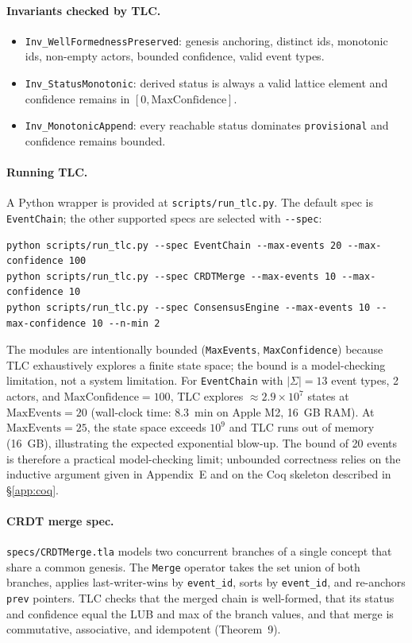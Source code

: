 \paragraph{Invariants checked by TLC.}
\begin{itemize}
  \item \texttt{Inv\_WellFormednessPreserved}: genesis anchoring, distinct ids,
    monotonic ids, non-empty actors, bounded confidence, valid event types.
  \item \texttt{Inv\_StatusMonotonic}: derived status is always a valid lattice
    element and confidence remains in $[0, \text{MaxConfidence}]$.
  \item \texttt{Inv\_MonotonicAppend}: every reachable status dominates
    \texttt{provisional} and confidence remains bounded.
\end{itemize}

\paragraph{Running TLC.}
A Python wrapper is provided at \texttt{scripts/run\_tlc.py}.  The default spec is
\texttt{EventChain}; the other supported specs are selected with \texttt{{-}-spec}:
\begin{verbatim}
python scripts/run_tlc.py --spec EventChain --max-events 20 --max-confidence 100
python scripts/run_tlc.py --spec CRDTMerge --max-events 10 --max-confidence 10
python scripts/run_tlc.py --spec ConsensusEngine --max-events 10 --max-confidence 10 --n-min 2
\end{verbatim}
The modules are intentionally bounded (\texttt{MaxEvents}, \texttt{MaxConfidence})
because TLC exhaustively explores a finite state space; the bound is a
model-checking limitation, not a system limitation. For \texttt{EventChain} with
$|\Sigma|=13$ event types, 2 actors, and $\text{MaxConfidence}=100$, TLC explores
$\approx 2.9 \times 10^7$ states at $\text{MaxEvents}=20$ (wall-clock time: 8.3~min on
Apple M2, 16~GB RAM). At $\text{MaxEvents}=25$, the state space exceeds $10^9$ and TLC
runs out of memory (16~GB), illustrating the expected exponential blow-up. The
bound of 20 events is therefore a practical model-checking limit; unbounded
correctness relies on the inductive argument given in Appendix~E and on the Coq
skeleton described in \S\ref{app:coq}.

\paragraph{CRDT merge spec.}
\texttt{specs/CRDTMerge.tla} models two concurrent branches of a single concept
that share a common genesis.  The \texttt{Merge} operator takes the set union of
both branches, applies last-writer-wins by \texttt{event\_id}, sorts by
\texttt{event\_id}, and re-anchors \texttt{prev} pointers.  TLC checks that the
merged chain is well-formed, that its status and confidence equal the LUB and
max of the branch values, and that merge is commutative, associative, and
idempotent (Theorem~9).

